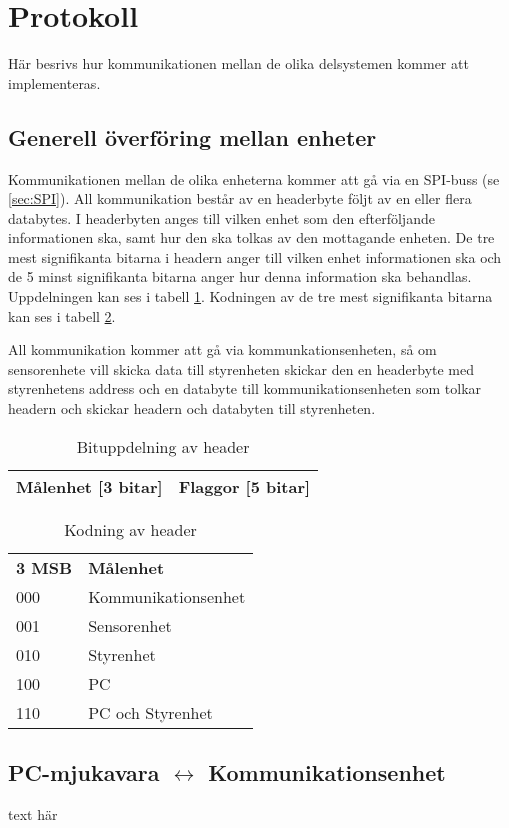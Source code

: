 \section{Protokoll}
Här besrivs hur kommunikationen mellan de olika delsystemen kommer att implementeras.

\subsection{Generell överföring mellan enheter}
Kommunikationen mellan de olika enheterna kommer att gå via en SPI-buss (se \ref{sec:SPI}).
All kommunikation består av en headerbyte följt av en eller flera databytes.
I headerbyten anges till vilken enhet som den efterföljande informationen ska, samt hur den ska tolkas av den mottagande enheten.
De tre mest signifikanta bitarna i headern anger till vilken enhet informationen ska och de 5 minst signifikanta bitarna anger 
hur denna information ska behandlas. Uppdelningen kan ses i tabell \ref{tab:header}.
Kodningen av de tre mest signifikanta bitarna kan ses i tabell \ref{tab:headerkod}.

All kommunikation kommer att gå via kommunkationsenheten, så om sensorenhete vill 
skicka data till styrenheten skickar den en headerbyte med styrenhetens address och en databyte till kommunikationsenheten som 
tolkar headern och skickar headern och databyten till styrenheten.
\begin{table}[h]
  \centering
  \begin{tabular}{| c | c |}
    \hline
    Målenhet [3 bitar] & Flaggor [5 bitar]\\
    \hline
  \end{tabular}
  \caption{Bituppdelning av header}
  \label{tab:header}
\end{table}

\begin{table}[h]
  \centering
  \begin{tabular}{l l}
    \textbf{3 MSB} & \textbf{Målenhet} \\
    000 & Kommunikationsenhet \\
    001 & Sensorenhet \\
    010 & Styrenhet \\
    100 & PC \\
    110 & PC och Styrenhet\\
  \end{tabular}
  \caption{Kodning av header}
  \label{tab:headerkod}
\end{table}
\subsection{PC-mjukavara $\longleftrightarrow$ Kommunikationsenhet}
text här
